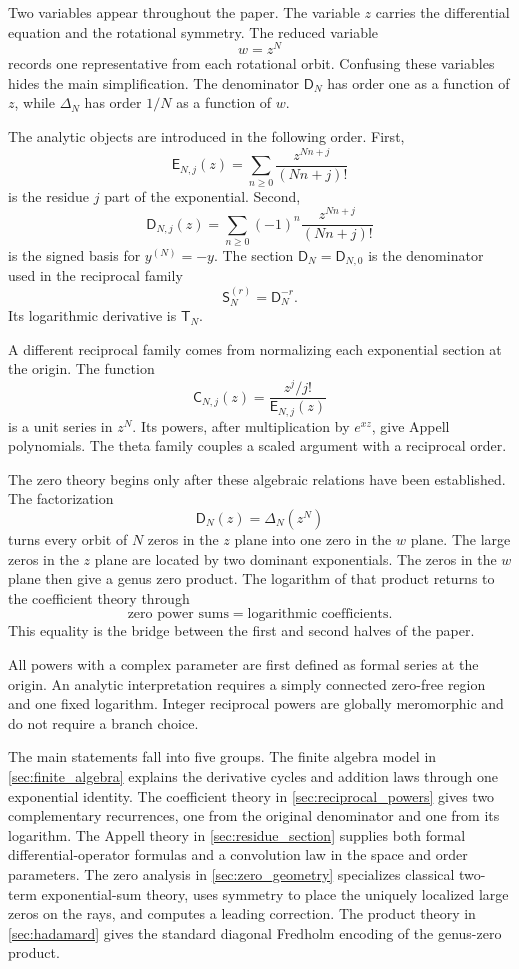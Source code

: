 \documentclass[11pt]{article}
\theoremstyle{definition}
\theoremstyle{remark}
\newcommand{\Dfun}{\mathsf D}
\newcommand{\Efun}{\mathsf E}
\newcommand{\Sfun}{\mathsf S}
\newcommand{\Tfun}{\mathsf T}
\newcommand{\Cfun}{\mathsf C}
\begin{document}
Two variables appear throughout the paper.  The variable $z$ carries the differential equation and the rotational symmetry.  The reduced variable
\[
w=z^N
\]
records one representative from each rotational orbit.  Confusing these variables hides the main simplification.  The denominator $\Dfun_N$ has order one as a function of $z$, while $\Delta_N$ has order $1/N$ as a function of $w$.

The analytic objects are introduced in the following order.  First,
\[
\Efun_{N,j}(z)
=
\sum_{n\geq0}\frac{z^{Nn+j}}{(Nn+j)!}
\]
is the residue $j$ part of the exponential.  Second,
\[
\Dfun_{N,j}(z)
=
\sum_{n\geq0}(-1)^n\frac{z^{Nn+j}}{(Nn+j)!}
\]
is the signed basis for $y^{(N)}=-y$.  The section $\Dfun_N=\Dfun_{N,0}$ is the denominator used in the reciprocal family
\[
\Sfun_N^{(r)}=\Dfun_N^{-r}.
\]
Its logarithmic derivative is $\Tfun_N$.

A different reciprocal family comes from normalizing each exponential section at the origin.  The function
\[
\Cfun_{N,j}(z)
=
\frac{z^j/j!}{\Efun_{N,j}(z)}
\]
is a unit series in $z^N$.  Its powers, after multiplication by $e^{xz}$, give Appell polynomials.  The theta family couples a scaled argument with a reciprocal order.

The zero theory begins only after these algebraic relations have been established.  The factorization
\[
\Dfun_N(z)=\Delta_N(z^N)
\]
turns every orbit of $N$ zeros in the $z$ plane into one zero in the $w$ plane.  The large zeros in the $z$ plane are located by two dominant exponentials.  The zeros in the $w$ plane then give a genus zero product.  The logarithm of that product returns to the coefficient theory through
\[
\text{zero power sums}
=
\text{logarithmic coefficients}.
\]
This equality is the bridge between the first and second halves of the paper.

All powers with a complex parameter are first defined as formal series at the origin.  An analytic interpretation requires a simply connected zero-free region and one fixed logarithm.  Integer reciprocal powers are globally meromorphic and do not require a branch choice.

The main statements fall into five groups.  The finite algebra model in \cref{sec:finite_algebra} explains the derivative cycles and addition laws through one exponential identity.  The coefficient theory in \cref{sec:reciprocal_powers} gives two complementary recurrences, one from the original denominator and one from its logarithm.  The Appell theory in \cref{sec:residue_section} supplies both formal differential-operator formulas and a convolution law in the space and order parameters.  The zero analysis in \cref{sec:zero_geometry} specializes classical two-term exponential-sum theory, uses symmetry to place the uniquely localized large zeros on the rays, and computes a leading correction.  The product theory in \cref{sec:hadamard} gives the standard diagonal Fredholm encoding of the genus-zero product.
\end{document}
